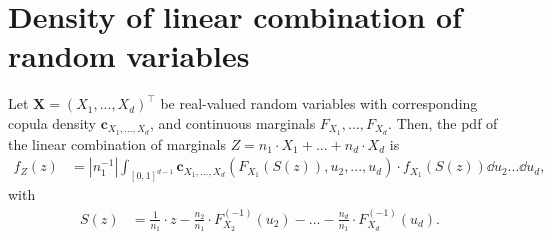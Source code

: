 \documentclass[11pt,a4paper,english]{article}
\begin{document}

\clearpage
%
\appendix
\section{Density of linear combination of random variables}
\label{sec:appendix}
\begin{proposition}
   Let $\bm{X} = (X_1, ..., X_d)^\top$ be real-valued random variables with corresponding
   copula density $\bm{c}_{X_1, ..., X_d}$, and continuous marginals $F_{X_1}, ..., F_{X_d}$.
   Then, the
   pdf of the linear combination of marginals $Z = n_1 \cdot X_1 +
   ... +  n_d \cdot X_d $ is
   \begin{align}
   f_Z(z) &= \left| n_1^{-1} \right| \int_{[0,1]^{d-1}} \bm{c}_{X_1,...,X_d}
      \left(F_{X_1} (S(z)), u_2, ..., u_d \right) \cdot
      f_{X_1} (S(z)) \dd u_2 ... \dd u_d, \label{density}
   \end{align}
   with
   \begin{align*}
      S(z) &= \frac{1}{n_1}\cdot z - \frac{n_2}{n_1} \cdot F^{(-1)}_{X_2}(u_2) - ... -  \frac{n_d}{n_1} \cdot F^{(-1)}_{X_d}(u_d).
      \end{align*}
   \end{proposition}
\end{document}
